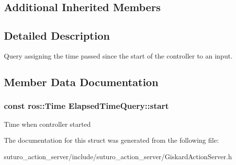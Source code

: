 \subsection*{Additional Inherited Members}


\subsection{Detailed Description}
Query assigning the time passed since the start of the controller to an input. 

\subsection{Member Data Documentation}
\hypertarget{structElapsedTimeQuery_a4b53ade61743b5e03306d177a09a0dd7}{
\subsubsection[{start}]{\setlength{\rightskip}{0pt plus 5cm}const ros\-::\-Time Elapsed\-Time\-Query\-::start\hspace{0.3cm}{\ttfamily [private]}}}\label{structElapsedTimeQuery_a4b53ade61743b5e03306d177a09a0dd7}
Time when controller started 

The documentation for this struct was generated from the following file\-:\begin{DoxyCompactItemize}
\item 
suturo\-\_\-action\-\_\-server/include/suturo\-\_\-action\-\_\-server/Giskard\-Action\-Server.\-h\end{DoxyCompactItemize}
